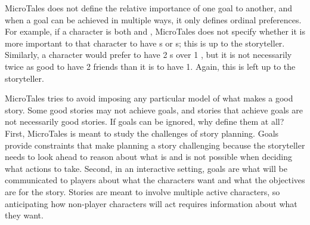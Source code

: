 \documentclass{nilreport}
\begin{document}
MicroTales does not define the relative importance of one goal to another, and when a goal can be achieved in multiple ways, it only defines ordinal preferences. For example, if a character is both  and , MicroTales does not specify whether it is more important to that character to have s or s; this is up to the storyteller. Similarly, a  character would prefer to have 2 s over 1 , but it is not necessarily twice as good to have 2 friends than it is to have 1. Again, this is left up to the storyteller.

MicroTales tries to avoid imposing any particular model of what makes a good story. Some good stories may not achieve goals, and stories that achieve goals are not necessarily good stories. If goals can be ignored, why define them at all? First, MicroTales is meant to study the challenges of story planning. Goals provide constraints that make planning a story challenging because the storyteller needs to look ahead to reason about what is and is not possible when deciding what actions to take. Second, in an interactive setting, goals are what will be communicated to players about what the characters want and what the objectives are for the story. Stories are meant to involve multiple active characters, so anticipating how non-player characters will act requires information about what they want.

\end{document}
